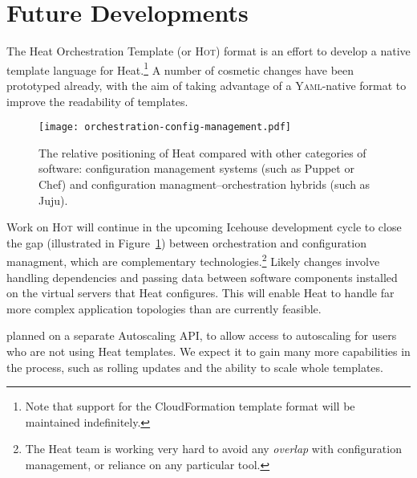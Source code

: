 \section{Future Developments}

The Heat Orchestration Template (or \textsc{Hot}) format is an effort to develop a native template language for Heat.\footnote{Note that support for the CloudFormation template format will be maintained indefinitely.} A number of cosmetic changes have been prototyped already, with the aim of taking advantage of a \textsc{Yaml}-native format to improve the readability of templates.

\begin{figure}[t]
\centering
\texttt{[image: orchestration-config-management.pdf]}
\caption{The relative positioning of Heat compared with other categories of software: configuration management systems (such as Puppet or Chef) and configuration managment--orchestration hybrids (such as Juju).}
\label{fig:orchestration-config-management}
\end{figure}

Work on \textsc{Hot} will continue in the upcoming Icehouse development cycle to close the gap (illustrated in Figure~\ref{fig:orchestration-config-management}) between orchestration and configuration managment, which are complementary technologies.\footnote{The Heat team is working very hard to avoid any \emph{overlap} with configuration management, or reliance on any particular tool.} Likely changes involve handling dependencies and passing data between software components installed on the virtual servers that Heat configures. This will enable Heat to handle far more complex application topologies than are currently feasible.

 planned on a separate Autoscaling API, to allow access to autoscaling for users who are not using Heat templates. We expect it to gain many more capabilities in the process, such as rolling updates and the ability to scale whole templates.

